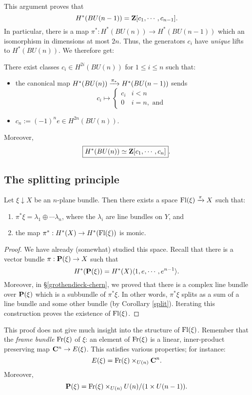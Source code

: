 This argument proves that
$$H^\ast(BU(n-1)) = \mathbf Z[c_1,\cdots,c_{n-1}].$$
In particular, there is a map $\pi^\ast:H^\ast(BU(n)) \to H^\ast(BU(n-1))$
which an isomorphism in dimensions at most $2n$. Thus, the generators $c_i$
have \emph{unique} lifts to $H^\ast(BU(n))$. We therefore get:
\begin{theorem}
    There exist classes $c_i\in H^{2i}(BU(n))$ for $1\leq i\leq n$ such that:
    \begin{itemize}
	\item the canonical map $H^\ast(BU(n)) \xrightarrow{{\pi_\ast}} H^\ast(BU(n-1))$
	    sends
	    $$
	    c_i \mapsto \begin{cases}
		c_i & i<n\\
		0 & i=n,\text{ and }
	    \end{cases}
	    $$
	\item $c_n := (-1)^n e\in H^{2n}(BU(n))$.
    \end{itemize}
    Moreover,
    $$\boxed{H^\ast(BU(n)) \simeq \mathbf Z[c_1,\cdots,c_n]}.$$
\end{theorem}
\subsection{The splitting principle}
\begin{theorem}\label{splitting-principle}
    Let $\xi\downarrow X$ be an $n$-plane bundle. Then there exists a space
    $\mathrm{Fl}(\xi) \xrightarrow{{\pi}} X$ such that:
    \begin{enumerate}
	\item $\pi^\ast \xi = \lambda_1\oplus\cdots\lambda_n$, where the
	    $\lambda_i$ are line bundles on $Y$, and
	\item the map $\pi^\ast: H^\ast(X) \to H^\ast(\mathrm{Fl}(\xi))$ is monic.
    \end{enumerate}
\end{theorem}
\begin{proof}
    We have already (somewhat) studied this space. Recall that there is a
    vector bundle $\pi:\mathbf P(\xi)\to X$ such that
    $$H^\ast(\mathbf P(\xi)) = H^\ast(X)\langle 1,e,\cdots,e^{n-1}\rangle.$$
    Moreover, in \S \ref{grothendieck-chern}, we proved that there is a complex
    line bundle over $\mathbf P(\xi)$ which is a subbundle of $\pi^\ast\xi$. In other
    words, $\pi^\ast\xi$ splits as a sum of a line bundle and some other bundle
    (by Corollary \ref{split}). Iterating this construction proves the
    existence of $\mathrm{Fl}(\xi)$.
\end{proof}
This proof does not give much insight into the structure of $\mathrm{Fl}(\xi)$.
Remember that the \emph{frame bundle} $\mathrm{Fr}(\xi)$ of $\xi$: an element of
$\mathrm{Fr}(\xi)$ is a linear, inner-product preserving map $\mathbf C^n\to E(\xi)$.
This satisfies various properties; for instance:
$$E(\xi) = \mathrm{Fr}(\xi)\times_{U(n)}\mathbf C^n.$$
Moreover,
$$\mathbf P(\xi) = \mathrm{Fr}(\xi)\times_{U(n)} U(n)/(1\times U(n-1)).$$

